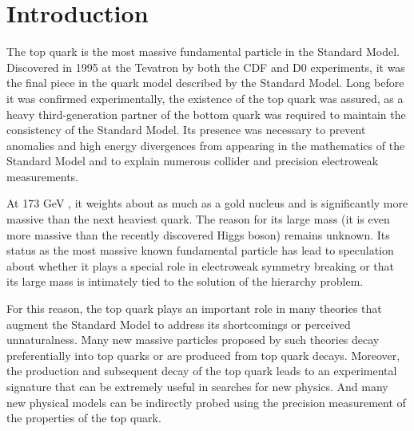 
\chapter{Introduction}

%



The top quark is the most massive fundamental particle in the Standard Model.
Discovered in 1995 at the Tevatron by both the CDF and D0 experiments, it was the final piece in the quark model described by the Standard Model. %
Long before it was confirmed experimentally, the existence of the top quark was assured,
as a heavy third-generation partner of the bottom quark was required to maintain the consistency of the Standard Model. %
Its presence was necessary to prevent anomalies and high energy divergences from appearing in the mathematics of the Standard Model
and to explain numerous collider and precision electroweak measurements.


At 173 GeV \cite{PARTICLE_DATA_GROUP}, it weights about as much as a gold nucleus and is significantly more massive than the next heaviest quark.
The reason for its large mass (it is even more massive than the recently discovered Higgs boson) remains unknown.
Its status as the most massive known fundamental particle has lead to speculation about whether it plays a special role in electroweak symmetry breaking
or that its large mass is intimately tied to the solution of the hierarchy problem.

For this reason, the top quark plays an important role in many theories that augment the Standard Model to address its shortcomings or perceived unnaturalness.
Many new massive particles proposed by such theories decay preferentially into top quarks or are produced from top quark decays.
Moreover, the production and subsequent decay of the top quark leads to an experimental signature that can be extremely useful in searches for new physics.
And many new physical models can be indirectly probed using the precision measurement of the properties of the top quark.

